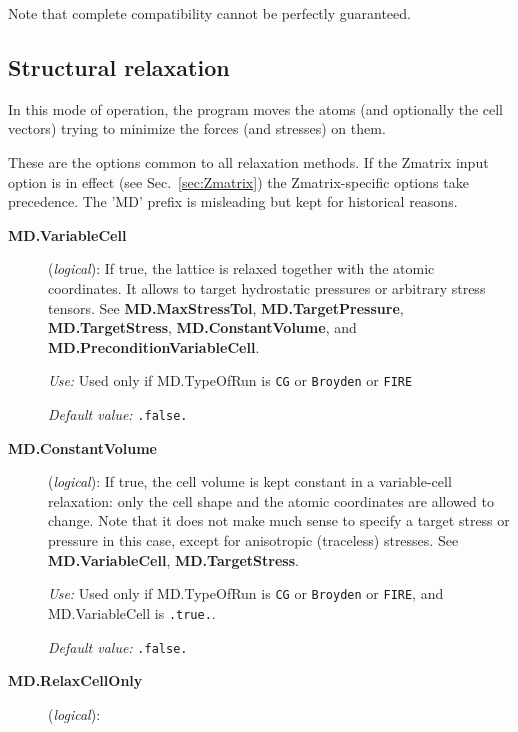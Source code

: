 Note that complete compatibility cannot be perfectly guaranteed.

\subsection{Structural relaxation}

In this mode of operation, the program moves the atoms (and optionally
the cell vectors) trying to minimize the forces (and stresses) on
them.

These are the options common to all relaxation methods. If the Zmatrix
input option is in effect (see Sec.~\ref{sec:Zmatrix}) the
Zmatrix-specific options take precedence.  The 'MD' prefix is
misleading but kept for historical reasons.

\begin{description}
\item[\textbf{MD.VariableCell}] (\textit{logical}):
    If true, the lattice is relaxed together with the
  atomic coordinates. It allows to target hydrostatic pressures or
  arbitrary stress tensors.  See \textbf{MD.MaxStressTol}, \textbf{MD.TargetPressure}, \textbf{MD.TargetStress}, \textbf{MD.ConstantVolume}, and \textbf{MD.PreconditionVariableCell}.

\textit{Use:} Used only if MD.TypeOfRun is \texttt{CG} or \texttt{Broyden} or
\texttt{FIRE}

\textit{Default value:} \texttt{.false.}

\item[\textbf{MD.ConstantVolume}] (\textit{logical}):
   If true, the cell volume is
  kept constant in a variable-cell relaxation: only the cell shape and
  the atomic coordinates are allowed to change.  Note that it does not
  make much sense to specify a target stress or pressure in this case,
  except for anisotropic (traceless) stresses.  See \textbf{MD.VariableCell}, \textbf{MD.TargetStress}.

\textit{Use:} Used only if MD.TypeOfRun is \texttt{CG} or \texttt{Broyden} or
\texttt{FIRE},  and  MD.VariableCell is \texttt{.true.}.

\textit{Default value:} \texttt{.false.}

\item[\textbf{MD.RelaxCellOnly}] (\textit{logical}):
 


\end{description}
